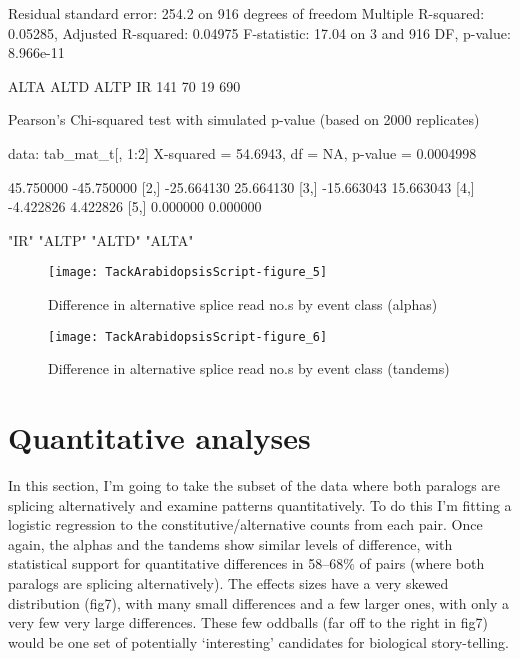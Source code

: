 \documentclass{article}
\begin{document}
\begin{Schunk}
\begin{Soutput}
Residual standard error: 254.2 on 916 degrees of freedom
Multiple R-squared:  0.05285,	Adjusted R-squared:  0.04975 
F-statistic: 17.04 on 3 and 916 DF,  p-value: 8.966e-11
\end{Soutput}
\begin{Soutput}
ALTA ALTD ALTP   IR 
 141   70   19  690 
\end{Soutput}
\begin{Soutput}
	Pearson's Chi-squared test with simulated p-value (based on 2000
	replicates)

data:  tab_mat_t[, 1:2]
X-squared = 54.6943, df = NA, p-value = 0.0004998
\end{Soutput}
\begin{Soutput}
           [,1]       [,2]
[1,]  45.750000 -45.750000
[2,] -25.664130  25.664130
[3,] -15.663043  15.663043
[4,]  -4.422826   4.422826
[5,]   0.000000   0.000000
\end{Soutput}
\begin{Soutput}
[1] "IR"   "ALTP" "ALTD" "ALTA"
\end{Soutput}
\end{Schunk}


\begin{figure}[h]
\begin{center}
\texttt{[image: TackArabidopsisScript-figure\_5]}
\end{center}
\caption{Difference in alternative splice read no.s by event class (alphas)}
\label{fig:fig5}
\end{figure}

\begin{figure}[h]
\begin{center}
\texttt{[image: TackArabidopsisScript-figure\_6]}
\end{center}
\caption{Difference in alternative splice read no.s by event class (tandems)}
\label{fig:fig6}
\end{figure}


\section{Quantitative analyses}


In this section, I'm going to take the subset of the data where both paralogs are splicing alternatively and examine patterns quantitatively. To do this I'm fitting a logistic regression to the constitutive/alternative counts from each pair. Once again, the alphas and the tandems show similar levels of difference, with statistical support for quantitative differences in 58--68\% of pairs (where both paralogs are splicing alternatively). The effects sizes have a very skewed distribution (fig7), with many small differences and a few larger ones, with only a very few very large differences. These few oddballs (far off to the right in fig7) would be one set of potentially `interesting' candidates for biological story-telling.
\end{document}
